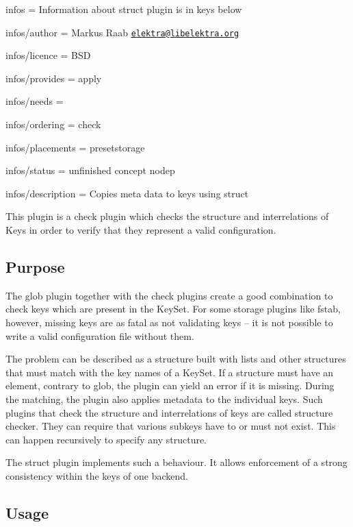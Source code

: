 
\begin{DoxyItemize}
\item infos = Information about struct plugin is in keys below
\item infos/author = Markus Raab \href{mailto:elektra@libelektra.org}{\tt elektra@libelektra.\+org}
\item infos/licence = B\+S\+D
\item infos/provides = apply
\item infos/needs =
\item infos/ordering = check
\item infos/placements = presetstorage
\item infos/status = unfinished concept nodep
\item infos/description = Copies meta data to keys using struct
\end{DoxyItemize}

This plugin is a check plugin which checks the structure and interrelations of Keys in order to verify that they represent a valid configuration.

\subsection*{Purpose}

The glob plugin together with the check plugins create a good combination to check keys which are present in the Key\+Set. For some storage plugins like fstab, however, missing keys are as fatal as not validating keys – it is not possible to write a valid configuration file without them.

The problem can be described as a structure built with lists and other structures that must match with the key names of a Key\+Set. If a structure must have an element, contrary to glob, the plugin can yield an error if it is missing. During the matching, the plugin also applies metadata to the individual keys. Such plugins that check the structure and interrelations of keys are called structure checker. They can require that various subkeys have to or must not exist. This can happen recursively to specify any structure.

The struct plugin implements such a behaviour. It allows enforcement of a strong consistency within the keys of one backend.

\subsection*{Usage}

